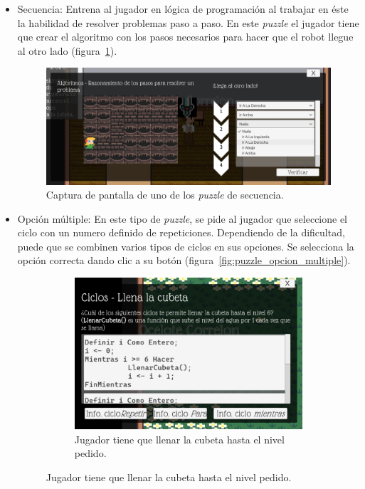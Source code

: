 \begin{itemize}
    \item Secuencia: Entrena al jugador en lógica de programación al trabajar en éste la habilidad de resolver problemas paso a paso. En este \textit{puzzle} el jugador tiene que crear el algoritmo con los pasos necesarios para hacer que el robot llegue al otro lado (figura~\ref{fig:puzzle_secuencia}).
        \begin{figure}[H]
        \centering
        \includegraphics[width=0.5\linewidth]{images/PuzzleSecuencia.png}
        \caption{Captura de pantalla de uno de los \textit{puzzle} de secuencia.}
        \label{fig:puzzle_secuencia}
    \end{figure}
    \item Opción múltiple: En este tipo de \textit{puzzle}, se pide al jugador que seleccione el ciclo con un numero definido de repeticiones. Dependiendo de la dificultad, puede que se combinen varios tipos de ciclos en sus opciones. Se selecciona la opción correcta dando clic a su botón (figura~\ref{fig:puzzle_opcion_multiple}).
    \begin{figure}[H]
            \centering
        \begin{subfigure}{0.4\textwidth}
            \centering
            \includegraphics[width=\textwidth]{images/OpcionMultiple1.png}
            \caption{Jugador tiene que llenar la cubeta hasta el nivel pedido.}

\end{subfigure}
\end{figure}
\end{itemize}

